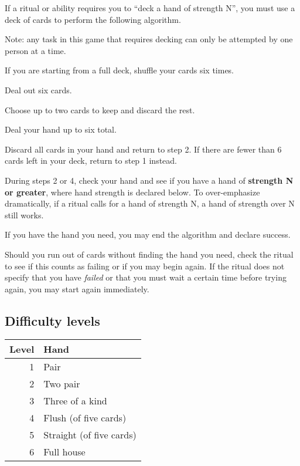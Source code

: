 \documentclass[green]{Guild Camp 2}
\begin{document}
\name{\gDecking{}}


If a ritual or ability requires you to ``deck a hand of strength N'', you must use a deck of cards to perform the following algorithm.

Note: any task in this game that requires decking can only be attempted by one person at a time.

\begin{enum}[Algorithm]
  \item If you are starting from a full deck, shuffle your cards six times.
  \item Deal out six cards.
  \item Choose up to two cards to keep and discard the rest.
  \item Deal your hand up to six total.
  \item Discard all cards in your hand and return to step 2.  If there are fewer than 6 cards left in your deck, return to step 1 instead.
\end{enum}

During steps 2 or 4, check your hand and see if you have a hand of {\bf strength N or greater}, where hand strength is declared below. To over-emphasize dramatically, if a ritual calls for a hand of strength N, a hand of strength over N still works. 

If you have the hand you need, you may end the algorithm and declare success.

Should you run out of cards without finding the hand you need, check the ritual to see if this counts as failing or if you may begin again. If the ritual does not specify that you have \emph{failed} or that you must wait a certain time before trying again, you may start again immediately.
  
\subsection*{Difficulty levels}

\begin{tabular}{|r|l|}
  \hline 
  Level & Hand \\
  \hline
  1 & Pair \\
  2 & Two pair  \\
  3 & Three of a kind\\
  4 & Flush (of five cards) \\
  5 & Straight (of five cards)\\
  6 & Full house\\
  \hline
\end{tabular}
\end{document}
